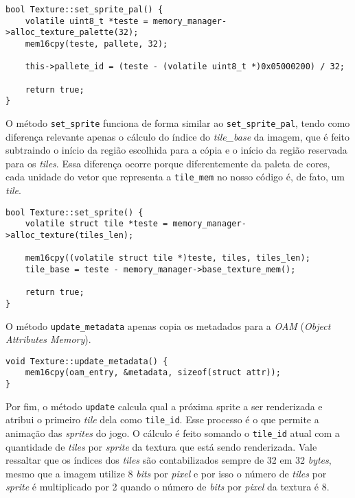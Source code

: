 \begin{lstlisting}[float,caption={Função de alocação da paleta de cores de uma textura.}]
bool Texture::set_sprite_pal() {
    volatile uint8_t *teste = memory_manager->alloc_texture_palette(32);
    mem16cpy(teste, pallete, 32);

    this->pallete_id = (teste - (volatile uint8_t *)0x05000200) / 32;

    return true;
}
\end{lstlisting}

O método \texttt{set\_sprite} funciona de forma similar ao \texttt{set\_sprite\_pal}, tendo como diferença relevante apenas o cálculo do índice do \textit{tile\_base} da imagem, que é feito subtraindo o início da região escolhida para a cópia e o início da região reservada para os \textit{tiles}. Essa diferença ocorre porque diferentemente da paleta de cores, cada unidade do vetor que representa a \texttt{tile\_mem} no nosso código é, de fato, um \textit{tile}.

\begin{lstlisting}[float,caption={Função de alocação das \textit{sprites} de uma textura.}]
bool Texture::set_sprite() {
    volatile struct tile *teste = memory_manager->alloc_texture(tiles_len);

    mem16cpy((volatile struct tile *)teste, tiles, tiles_len);
    tile_base = teste - memory_manager->base_texture_mem();

    return true;
}
\end{lstlisting}

O método \texttt{update\_metadata} apenas copia os metadados para a \textit{OAM} (\textit{Object Attributes Memory}).

\begin{lstlisting}[float,caption={Função de cópia dos metadados das texturas.}]
void Texture::update_metadata() {
    mem16cpy(oam_entry, &metadata, sizeof(struct attr));
}
\end{lstlisting}

Por fim, o método \texttt{update} calcula qual a próxima sprite a ser renderizada e atribui o primeiro \textit{tile} dela como \texttt{tile\_id}. Esse processo é o que permite a animação das \textit{sprites} do jogo. O cálculo é feito somando o \texttt{tile\_id} atual com a quantidade de \textit{tiles} por \textit{sprite} da textura que está sendo renderizada. Vale ressaltar que os índices dos \textit{tiles} são contabilizados sempre de 32 em 32 \textit{bytes}, mesmo que a imagem utilize 8 \textit{bits} por \textit{pixel} e por isso o número de \textit{tiles} por \textit{sprite} é multiplicado por 2 quando o número de \textit{bits} por \textit{pixel} da textura é 8.

